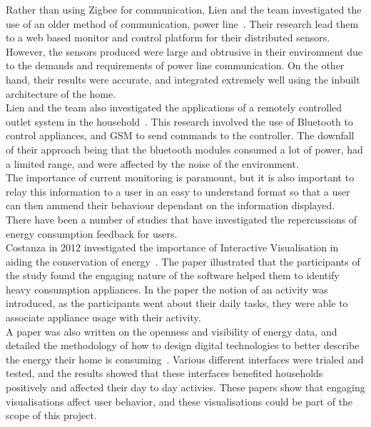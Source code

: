 \documentclass[draft,preprint,12pt,3p]{elsarticle}
\begin{document}
Rather than using Zigbee for communication, Lien and the team investigated the use of an older method of communication, power line~\cite{lien2008power}. Their research lead them to a web based monitor and control platform for their distributed sensors. However, the sensors produced were large and obtrusive in their environment due to the demands and requirements of power line communication. On the other hand, their results were accurate, and integrated extremely well using the inbuilt architecture of the home. \\
Lien and the team also investigated the applications of a remotely controlled outlet system in the household~\cite{lien2006remotely}. This research involved the use of Bluetooth to control appliances, and GSM to send commands to the controller. The downfall of their approach being that the bluetooth modules consumed a lot of power, had a limited range, and were affected by the noise of the environment.\\
The importance of current monitoring is paramount, but it is also important to relay this information to a user in an easy to understand format so that a user can then ammend their behaviour dependant on the information displayed.\\
There have been a number of studies that have investigated the repercussions of energy consumption feedback for users.\\
Costanza in 2012 investigated the importance of Interactive Visualisation in aiding the conservation of energy~\cite{costanza2012understanding}. The paper illustrated that the participants of the study found the engaging nature of the software helped them to identify heavy consumption appliances. In the paper the notion of an activity was introduced, as the participants went about their daily tasks, they were able to associate appliance usage with their activity. \\
A paper was also written on the openness and visibility of energy data, and detailed the methodology of how to design digital technologies to better describe the energy their home is consuming~\cite{price2013looking}. Various different interfaces were trialed and tested, and the results showed that these interfaces benefited households positively and affected their day to day activies.
These papers show that engaging visualisations affect user behavior, and these visualisations could be part of the scope of this project.\\
\end{document}
